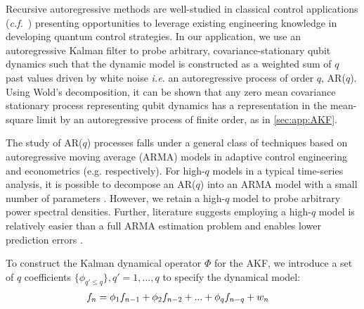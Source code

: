 Recursive autoregressive methods are well-studied in classical control applications  (\emph{c.f.}~\cite{moon2006real}) presenting opportunities to leverage existing engineering knowledge in developing quantum control strategies.  In our application, we use an autoregressive Kalman filter to probe arbitrary, covariance-stationary qubit dynamics such that the dynamic model is constructed as a weighted sum of $q$ past values driven by white noise {\em i.e.} an autoregressive process of order $q$, AR($q$). Using Wold's decomposition, it can be shown that any zero mean covariance stationary process representing qubit dynamics has a representation in the mean-square limit by an autoregressive process of finite order, as in \cref{sec:app:AKF}.

The study of AR($q$) processes falls under a general class of techniques based on autoregressive moving average (ARMA) models in adaptive control engineering and econometrics (e.g.  \cite{landau1998adaptive,hamilton1994time} respectively). For high-$q$ models in a typical time-series analysis, it is possible to decompose an AR($q$) into an ARMA model with a small number of parameters \cite{brockwell1996introduction, salzmann1991detection}. However, we retain a high-$q$ model to probe arbitrary power spectral densities. Further, literature suggests employing a high-$q$ model is relatively easier than a full ARMA estimation problem and enables lower prediction errors \cite{wahlberg1989estimation,brockwell1996introduction}. 

To construct the Kalman dynamical operator $\Phi$ for the AKF, we introduce a
set of $q$ coefficients $\{\phi_{q' \leq q}\}, q' = 1, ... , q $ to specify the dynamical model:
\begin{align}
	f_n &= \phi_1 f_{n-1} + \phi_2 f_{n-2} + ... + \phi_q f_{n-q} + w_n \label{eqn:main:ARprocess}
\end{align}

